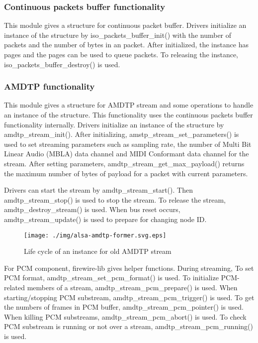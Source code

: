\documentclass[onecolumn]{article}
\begin{document}
\subsubsection{Continuous packets buffer functionality}

This module gives a structure for continuous packet buffer. Drivers initialize an instance of the structure by iso\_packets\_buffer\_init() with the number of packets and the number of bytes in an packet. After initialized, the instance has pages and the pages can be used to queue packets. To releasing the instance, iso\_packets\_buffer\_destroy() is used.

\subsubsection{AMDTP functionality}

This module gives a structure for AMDTP stream and some operations to handle an instance of the structure. This functionality uses the continuous packets buffer functionality internally. Drivers initialize an instance of the structure by amdtp\_stream\_init(). After initializing, amstp\_stream\_set\_parameters() is used to set streaming parameters such as sampling rate, the number of Multi Bit Linear Audio (MBLA) data channel and MIDI Conformant data channel for the stream. After setting parameters, amdtp\_stream\_get\_max\_payload() returns the maximum number of bytes of payload for a packet with current parameters.

Drivers can start the stream by amdtp\_stream\_start(). Then amdtp\_stream\_stop() is used to stop the stream. To release the stream, amdtp\_destroy\_stream() is used. When bus reset occurs, amdtp\_stream\_update() is used to prepare for changing node ID.

\begin{figure}[H]
	\centering
	\texttt{[image: ./img/alsa-amdtp-former.svg.eps]}
	\caption{{Life cycle of an instance for old AMDTP stream}}
	\label{{lifecycle-old-amdtp-stream}}
\end{figure}

For PCM component, firewire-lib gives helper functions. During streaming, To set PCM format, amdtp\_stream\_set\_pcm\_format() is used. To initialize PCM-related members of a stream, amdtp\_stream\_pcm\_prepare() is used. When starting/stopping PCM substream, amdtp\_stream\_pcm\_trigger() is used. To get the numbers of frames in PCM buffer, amdtp\_stream\_pcm\_pointer() is used. When killing PCM substreams, amdtp\_stream\_pcm\_abort() is used. To check PCM substream is running or not over a stream, amdtp\_stream\_pcm\_running() is used.
\end{document}
